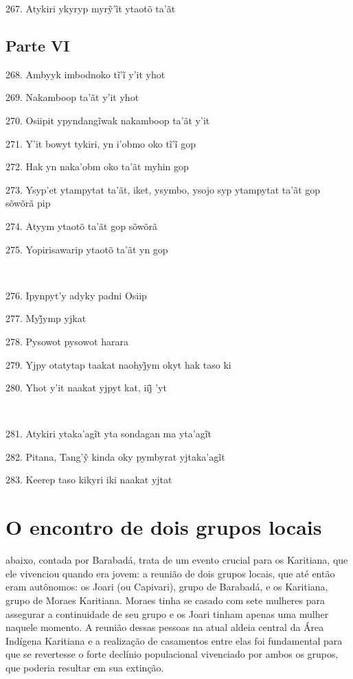 267. Atykiri ykyryp myrỹ’ĩt ytaotõ ta’ãt

\section{Parte VI}

268. Ambyyk imbodnoko tĩ’ĩ y’it yhot

269. Nakamboop ta'ãt y'it yhot

270. Osiipit ypyndangĩwak nakamboop ta’ãt y’it

271. Y’it bowyt tykiri, yn i’obmo oko tĩ’ĩ gop

272. Hak yn naka'obm oko ta'ãt myhin gop

273. Ysyp'et ytampytat ta'ãt, iket, ysymbo, ysojo syp ytampytat ta'ãt gop sõwõrã pip

274. Atyym ytaotõ ta'ãt gop sõwõrã

275. Yopirisawarip ytaotõ ta'ãt yn gop

~

276. Ipynpyt'y adyky padni Osiip

277. Myj̃ymp yjkat

278. Pysowot pysowot harara

279. Yjpy otatytap taakat naohyj̃ym okyt hak taso ki

280. Yhot y’it naakat yjpyt kat, iij̃ ’yt

~

281. Atykiri ytaka’agĩt yta sondagan ma yta’agĩt

282. Pitana, Tang’ỹ kinda oky pymbyrat yjtaka’agĩt

283. Keerep taso kikyri iki naakat yjtat

\endgroup

\chapter{O encontro de dois grupos locais}

 abaixo, contada por Barabadá, trata de um evento crucial para
os Karitiana, que ele vivenciou quando era jovem: a reunião de dois
grupos locais, que até então eram autônomos: os Joari (ou Capivari),
grupo de Barabadá, e os Karitiana, grupo de Moraes Karitiana. Moraes
tinha se casado com sete mulheres para assegurar a continuidade de seu
grupo e os Joari tinham apenas uma mulher naquele momento. A reunião
dessas pessoas na atual aldeia central da Área Indígena Karitiana e a
realização de casamentos entre elas foi fundamental para que se
revertesse o forte declínio populacional vivenciado por ambos os grupos,
que poderia resultar em sua extinção.

